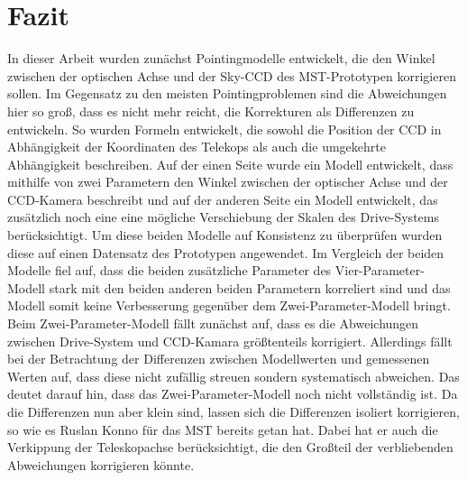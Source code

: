 \chapter{Fazit}
In dieser Arbeit wurden zunächst Pointingmodelle entwickelt, die den Winkel zwischen der optischen Achse und der Sky-CCD des MST-Prototypen korrigieren sollen. Im Gegensatz zu den meisten Pointingproblemen sind die Abweichungen hier so groß, dass es nicht mehr reicht, die Korrekturen als Differenzen zu entwickeln. So wurden Formeln entwickelt, die sowohl die Position der CCD in Abhängigkeit der Koordinaten des Telekops als auch die umgekehrte Abhängigkeit beschreiben. Auf der einen Seite wurde ein Modell entwickelt, dass mithilfe von zwei Parametern den Winkel zwischen der optischer Achse und der CCD-Kamera beschreibt und auf der anderen Seite ein Modell entwickelt, das zusätzlich noch eine eine mögliche Verschiebung der Skalen des Drive-Systems berücksichtigt. Um diese beiden Modelle auf Konsistenz zu überprüfen wurden diese auf einen Datensatz des Prototypen angewendet. Im Vergleich der beiden Modelle fiel auf, dass die beiden zusätzliche Parameter des Vier-Parameter-Modell stark mit den beiden anderen beiden Parametern korreliert sind und das Modell somit keine Verbesserung gegenüber dem Zwei-Parameter-Modell bringt. Beim Zwei-Parameter-Modell fällt zunächst auf, dass es die Abweichungen zwischen Drive-System und CCD-Kamara größtenteils korrigiert. Allerdings fällt bei der Betrachtung der Differenzen zwischen Modellwerten und gemessenen Werten auf, dass diese nicht zufällig streuen sondern systematisch abweichen. Das deutet darauf hin, dass das Zwei-Parameter-Modell noch nicht vollständig ist. Da die Differenzen nun aber klein sind, lassen sich die Differenzen isoliert korrigieren, so wie es Ruslan Konno \cite{Ruslan} für das MST bereits getan hat. Dabei hat er auch die Verkippung der Teleskopachse berücksichtigt, die den Großteil der verbliebenden Abweichungen korrigieren könnte.